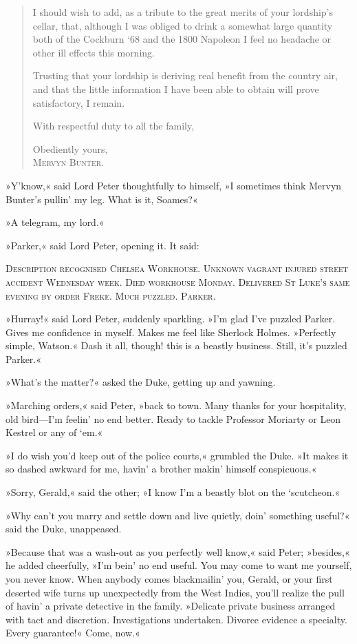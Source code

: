 \begin{quotation}
I should wish to add, as a tribute to the great merits of your lordship's cellar, that, although I was obliged to drink a somewhat large quantity both of the Cockburn `68 and the 1800 Napoleon I feel no headache or other ill effects this morning.

Trusting that your lordship is deriving real benefit from the country air, and that the little information I have been able to obtain will prove satisfactory, I remain.

With respectful duty to all the family,

\begin{flushright}
Obediently yours,\\
\textsc{Mervyn Bunter.}
\end{flushright}
\end{quotation}

»Y'know,« said Lord Peter thoughtfully to himself, »I sometimes think Mervyn Bunter's pullin' my leg. What is it, Soames?«

»A telegram, my lord.«

»Parker,« said Lord Peter, opening it. It said:

\textsc{Description recognised Chelsea Workhouse. Unknown vagrant injured street accident Wednesday week. Died workhouse Monday. Delivered St Luke's same evening by order Freke. Much puzzled. Parker.}

»Hurray!« said Lord Peter, suddenly sparkling. »I'm glad I've puzzled Parker. Gives me confidence in myself. Makes me feel like Sherlock Holmes. »Perfectly simple, Watson.« Dash it all, though! this is a beastly business. Still, it's puzzled Parker.«

»What's the matter?« asked the Duke, getting up and yawning.

»Marching orders,« said Peter, »back to town. Many thanks for your hospitality, old bird—I'm feelin' no end better. Ready to tackle Professor Moriarty or Leon Kestrel or any of `em.«

»I do wish you'd keep out of the police courts,« grumbled the Duke. »It makes it so dashed awkward for me, havin' a brother makin' himself conspicuous.«

»Sorry, Gerald,« said the other; »I know I'm a beastly blot on the `scutcheon.«

»Why can't you marry and settle down and live quietly, doin' something useful?« said the Duke, unappeased.

»Because that was a wash-out as you perfectly well know,« said Peter; »besides,« he added cheerfully, »I'm bein' no end useful. You may come to want me yourself, you never know. When anybody comes blackmailin' you, Gerald, or your first deserted wife turns up unexpectedly from the West Indies, you'll realize the pull of havin' a private detective in the family. »Delicate private business arranged with tact and discretion. Investigations undertaken. Divorce evidence a specialty. Every guarantee!« Come, now.«

